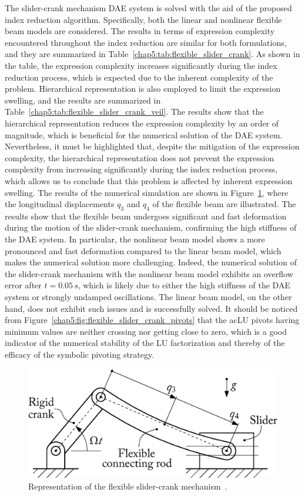 The slider-crank mechanism \ac{DAE} system is solved with the aid of the proposed index reduction algorithm. Specifically, both the linear and nonlinear flexible beam models are considered. The results in terms of expression complexity encountered throughout the index reduction are similar for both formulations, and they are summarized in Table~\ref{chap5:tab:flexible_slider_crank}. As shown in the table, the expression complexity increases significantly during the index reduction process, which is expected due to the inherent complexity of the problem. Hierarchical representation is also employed to limit the expression swelling, and the results are summarized in Table~\ref{chap5:tab:flexible_slider_crank_veil}. The results show that the hierarchical representation reduces the expression complexity by an order of magnitude, which is beneficial for the numerical solution of the \ac{DAE} system. Nevertheless, it must be highlighted that, despite the mitigation of the expression complexity, the hierarchical representation does not prevent the expression complexity from increasing significantly during the index reduction process, which allows us to conclude that this problem is affected by inherent expression swelling. The results of the numerical simulation are shown in Figure~\ref{chap5:fig:flexible_slider_crank}, where the longitudinal displacements $q_3$ and $q_4$ of the flexible beam are illustrated. The results show that the flexible beam undergoes significant and fast deformation during the motion of the slider-crank mechanism, confirming the high stiffness of the \ac{DAE} system. In particular, the nonlinear beam model shows a more pronounced and fast deformation compared to the linear beam model, which makes the numerical solution more challenging. Indeed, the numerical solution of the slider-crank mechanism with the nonlinear beam model exhibits an overflow error after $t = \SI{0.05}{\second}$, which is likely due to either the high stiffness of the \ac{DAE} system or strongly undamped oscillations. The linear beam model, on the other hand, does not exhibit such issues and is successfully solved. It should be noticed from Figure~\ref{chap5:fig:flexible_slider_crank_pivots} that the ac{LU} pivots having minimum values are neither crossing nor getting close to zero, which is a good indicator of the numerical stability of the \ac{LU} factorization and thereby of the efficacy of the symbolic pivoting strategy.

\begin{figure}[htb]
  \centering
  \includegraphics[width=0.475\linewidth]{figures/chapter_5/flexible_slider_crank}
  \caption{Representation of the flexible slider-crank mechanism~\cite{lioen1998test, mazzia2008test}.}
  \label{chap5:fig:flexible_slider_crank}
\end{figure}

